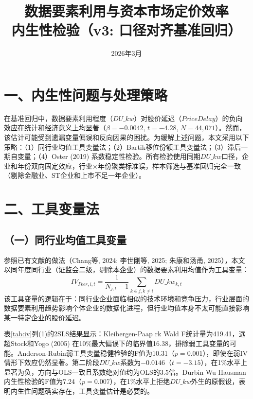 \documentclass[11pt,a4paper]{article}
\title{{\hei\Large 数据要素利用与资本市场定价效率} \\[8pt]
{\large 内生性检验（v3: 口径对齐基准回归）}}
\author{}
\date{2026年3月}
\begin{document}
\maketitle
\thispagestyle{fancy}

\section*{一、内生性问题与处理策略}

在基准回归中，数据要素利用程度（$DU\_kw$）对股价延迟（$PriceDelay$）的负向效应在统计和经济意义上均显著（$\beta=-0.0042$, $t=-4.28$, $N=44{,}071$）。然而，该估计可能受到遗漏变量偏误和反向因果的困扰。为缓解上述问题，本文采用以下策略：（1）同行业均值工具变量法；（2）Bartik移位份额工具变量法；（3）滞后一期自变量；（4）Oster (2019) 系数稳定性检验。所有检验使用同期$DU\_kw$口径，企业和年份双向固定效应，行业$\times$年份聚类标准误，样本筛选与基准回归完全一致（剔除金融业、ST企业和上市不足一年企业）。

\section*{二、工具变量法}

\subsection*{（一）同行业均值工具变量}

参照已有文献的做法（Chang等, 2024; 李世刚等, 2025; 朱康和汤甬, 2025），本文以同年度同行业（证监会二级，剔除本企业）的数据要素利用均值作为工具变量：
\begin{equation}
IV_{Peer,i,t} = \frac{1}{N_{j,t}-1}\sum_{k \in j, k \neq i} DU\_kw_{k,t}
\end{equation}
该工具变量的逻辑在于：同行业企业面临相似的技术环境和竞争压力，行业层面的数据要素利用趋势影响个体企业的数据化进程，但行业均值本身不太可能直接影响某一特定企业的股价延迟。

表\ref{tab:iv}列(1)的2SLS结果显示：Kleibergen-Paap rk Wald F统计量为419.41，远超Stock和Yogo (2005) 在10\%最大偏误下的临界值16.38，排除弱工具变量的可能。Anderson-Rubin弱工具变量稳健检验的F值为10.31（$p=0.001$），即使在弱IV情形下效应仍然显著。第二阶段$DU\_kw$系数为$-0.0146$（$t=-3.15$），在1\%水平上显著为负，方向与OLS一致且系数绝对值约为OLS的3.5倍。Durbin-Wu-Hausman内生性检验的F值为7.24（$p=0.007$），在1\%水平上拒绝$DU\_kw$外生的原假设，表明内生性问题确实存在，工具变量估计是必要的。
\end{document}
